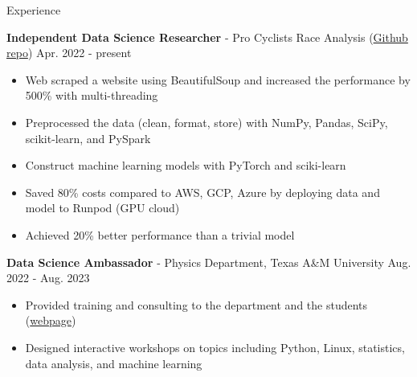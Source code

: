 \documentclass{resume}
\begin{document}
\begin{rSection}{Experience}
    \item \textbf{Independent Data Science Researcher} - {Pro Cyclists Race Analysis} (\href{https://github.com/noctildon/pro_cyclists}{Github repo}) \hfill Apr. 2022 - present
        \begin{itemize}
        \item Web scraped a website using BeautifulSoup and increased the performance by 500\% with multi-threading
        \item Preprocessed the data (clean, format, store) with NumPy, Pandas, SciPy, scikit-learn, and PySpark
        \item Construct machine learning models with PyTorch and sciki-learn
        \item Saved 80\% costs compared to AWS, GCP, Azure by deploying data and model to Runpod (GPU cloud)
        \item Achieved 20\% better performance than a trivial model
        \end{itemize}

    \item \textbf{Data Science Ambassador} - Physics Department, Texas A\&M University \hfill Aug. 2022 - Aug. 2023
        \begin{itemize}
        \item Provided training and consulting to the department and the students (\href{https://noctildon.github.io/DS_ambassador/index.html}{webpage})
        \item Designed interactive workshops on topics including Python, Linux, statistics, data analysis, and machine learning
        \end{itemize}


\end{rSection}
\end{document}
